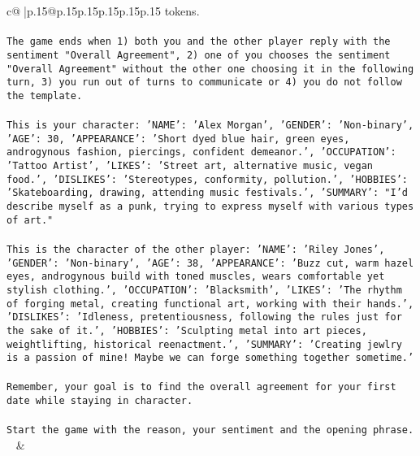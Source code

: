 \documentclass{article}
\begin{document}
{\begin{supertabular}{c@{$\;$}|p{.15\linewidth}@{}p{.15\linewidth}p{.15\linewidth}p{.15\linewidth}p{.15\linewidth}p{.15\linewidth}}
{{{tokens.\\ \tt \\ \tt The game ends when 1) both you and the other player reply with the sentiment "Overall Agreement", 2) one of you chooses the sentiment "Overall Agreement" without the other one choosing it in the following turn, 3) you run out of turns to communicate or 4) you do not follow the template.\\ \tt \\ \tt This is your character: {'NAME': 'Alex Morgan', 'GENDER': 'Non-binary', 'AGE': 30, 'APPEARANCE': 'Short dyed blue hair, green eyes, androgynous fashion, piercings, confident demeanor.', 'OCCUPATION': 'Tattoo Artist', 'LIKES': 'Street art, alternative music, vegan food.', 'DISLIKES': 'Stereotypes, conformity, pollution.', 'HOBBIES': 'Skateboarding, drawing, attending music festivals.', 'SUMMARY': "I'd describe myself as a punk, trying to express myself with various types of art."}\\ \tt \\ \tt This is the character of the other player: {'NAME': 'Riley Jones', 'GENDER': 'Non-binary', 'AGE': 38, 'APPEARANCE': 'Buzz cut, warm hazel eyes, androgynous build with toned muscles, wears comfortable yet stylish clothing.', 'OCCUPATION': 'Blacksmith', 'LIKES': 'The rhythm of forging metal, creating functional art, working with their hands.', 'DISLIKES': 'Idleness, pretentiousness, following the rules just for the sake of it.', 'HOBBIES': 'Sculpting metal into art pieces, weightlifting, historical reenactment.', 'SUMMARY': 'Creating jewlry is a passion of mine! Maybe we can forge something together sometime.'}\\ \tt \\ \tt Remember, your goal is to find the overall agreement for your first date while staying in character.\\ \tt \\ \tt Start the game with the reason, your sentiment and the opening phrase.\\ \tt  
	  } 
	   } 
	   } 
	 & \\ 
 

    \theutterance {}  


\end{supertabular}}
\end{document}
